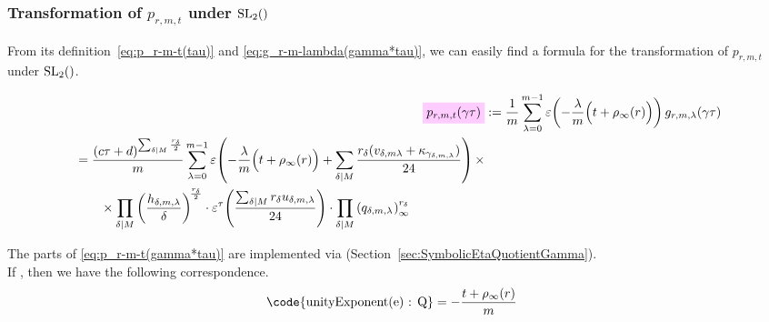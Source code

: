 \documentclass{article}
\begin{document}
\begin{Hemmecke}


\subsubsection{Transformation of $p_{r,m,t}$ under $\SL2Z$}

From its definition~\eqref{eq:p_r-m-t(tau)} and
\eqref{eq:g_r-m-lambda(gamma*tau)}, we can easily find a formula for
the transformation of $p_{r,m,t}$ under $\SL2Z$.

\begin{align}
  \defineNotation[p-r-m-t-gamma-tau]{p_{r,m,t}(\gamma\tau)}
  &:=\frac{1}{m} \sum_{\lambda=0}^{m-1}
    \unityPower{-\frac{\lambda}{m}\Bigl(t+\rho_\infty(r)\Bigr)}
    g_{r,m,\lambda}(\gamma\tau)\notag\\
  \begin{split}
  &=
    \frac{(c\tau+d)^{\divisorsum{M} \frac{r_\delta}{2}}}{m}
    \sum_{\lambda=0}^{m-1}
    \unityPower{-\frac{\lambda}{m}\Bigl(t+\rho_\infty(r)\Bigr)
    + \divisorsum{M}\frac{r_\delta(v_{\delta,m\lambda} +
    \kappa_{\gamma_{\delta,m,\lambda}})}{24}} \times\\
  & \qquad\times
    \divisorprod{M}
    \left(\frac{h_{\delta,m,\lambda}}{\delta}\right)^{\!\frac{r_\delta}{2}}
    \cdot
    \unityPowerTau{\frac{\divisorsum{M} r_\delta u_{\delta,m,\lambda}}{24}}
    \cdot
    \divisorprod{M}
    \eulerFunction[q_{\delta,m,\lambda}]{}^{r_\delta}
  \end{split}
  \label{eq:p_r-m-t(gamma*tau)}
\end{align}

The parts of \eqref{eq:p_r-m-t(gamma*tau)} are implemented via
\textcolor{blue}{}
(Section~\ref{sec:SymbolicEtaQuotientGamma}).
\\
If , then we have the
following correspondence.
\begin{align*}
  \text{\code{unityExponent(e) : Q}}
  &=
    -\frac{t+\rho_\infty(r)}{m}
\end{align*}







\end{Hemmecke}
\end{document}
